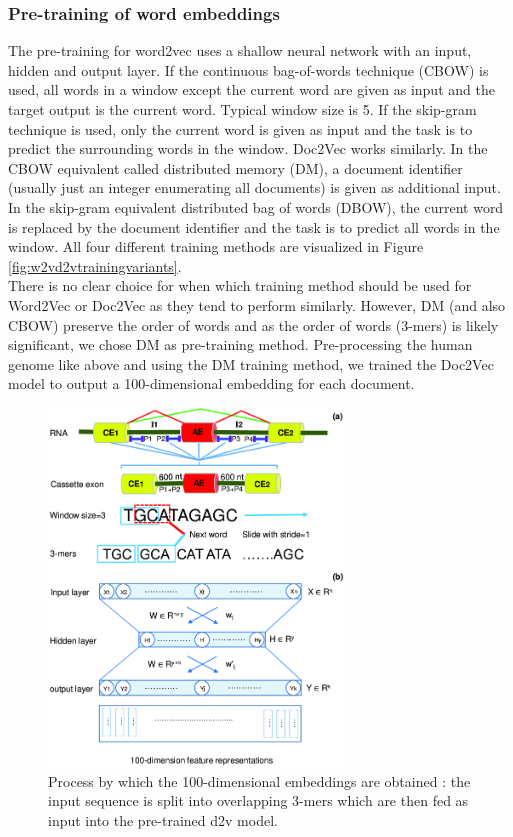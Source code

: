 \subsubsection{Pre-training of word embeddings}
The pre-training for word2vec uses a shallow neural network with an input, hidden and output layer. If the continuous bag-of-words technique (CBOW) is used, all words in a window except the current word are given as input and the target output is the current word. Typical window size is 5. %
If the skip-gram technique is used, only the current word is given as input and the task is to predict the surrounding words in the window. Doc2Vec works similarly. In the CBOW equivalent called distributed memory (DM), a document identifier (usually just an integer enumerating all documents) is given as additional input. In the skip-gram equivalent distributed bag of words (DBOW), the current word is replaced by the document identifier and the task is to predict all words in the window. All four different training methods are visualized in Figure \ref{fig:w2vd2vtrainingvariants}.\\
There is no clear choice for when which training method should be used for Word2Vec or Doc2Vec as they tend to perform similarly. However, DM (and also CBOW) preserve the order of words and as the order of words (3-mers) is likely significant, we chose DM as pre-training method.
Pre-processing the human genome like above and using the DM training method, we trained the Doc2Vec model to output a 100-dimensional embedding for each document.
\begin{figure}
	\includegraphics[width=0.7\textwidth]{../visualizations/ch4-methods/d2v_training.png} 
	\caption{
		Process by which the 100-dimensional embeddings are obtained \cite{d2vsplicing}: the input sequence is split into overlapping 3-mers which are then fed as input into the pre-trained d2v model. 
	}
	\label{fig:d2vtraining}
\end{figure}


